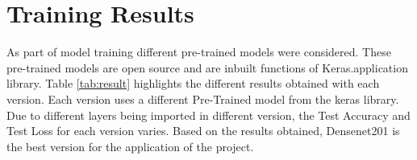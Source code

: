 \section{Training Results}
\label{section:results}
As part of model training different pre-trained models were considered. These pre-trained models are open source and are inbuilt functions of Keras.application library. 
Table \ref{tab:result} highlights the different results obtained with each version. Each version uses a different Pre-Trained model from the keras library. Due to different layers being imported in different version, the Test Accuracy and Test Loss for each version varies. Based on the results obtained, Densenet201 is the best version for the application of the project.\\

